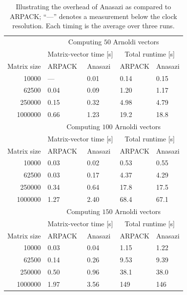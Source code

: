 \documentclass[acmtoms,acmnow]{acmtrans2m}
\begin{document}
\begin{table}
\caption{Illustrating the overhead of Anasazi as compared to ARPACK; ``---'' denotes a measurement
below the clock resolution. Each timing is the average over three runs.}
\label{table:timings}
\begin{center}
\begin{tabular}{r|ll|ll|}
       \cline{2-5} %
        & \multicolumn{4}{c|}{Computing $50$ Arnoldi vectors} \\ \cline{2-5}
        & \multicolumn{2}{c|}{Matrix-vector time [s]} &
       \multicolumn{2}{c|}{Total runtime [s]}\\ \hline
       Matrix size & ARPACK & Anasazi & ARPACK & Anasazi \\ \hline %
       10000 & --- & 0.01 & 0.14 & 0.15 \\
       62500 & 0.04 & 0.09 & 1.20 & 1.17 \\
       250000 & 0.15 & 0.32 & 4.98 & 4.79 \\
       1000000 & 0.66 & 1.23 & 19.2 & 18.8 \\
       \hline
        & \multicolumn{4}{c|}{Computing $100$ Arnoldi vectors} \\ \cline{2-5}
        & \multicolumn{2}{c|}{Matrix-vector time [s]} &
       \multicolumn{2}{c|}{Total runtime [s]}\\ \hline
       Matrix size & ARPACK & Anasazi & ARPACK & Anasazi \\ \hline %
       10000 & 0.03 & 0.02 & 0.53 & 0.55 \\
       62500 & 0.03 & 0.17 & 4.37 & 4.29 \\
       250000 & 0.34 & 0.64 & 17.8 & 17.5 \\
       1000000 & 1.27 & 2.40 & 68.4 & 67.1 \\
       \hline
        & \multicolumn{4}{c|}{Computing $150$ Arnoldi vectors} \\ \cline{2-5}
        & \multicolumn{2}{c|}{Matrix-vector time [s]} &
       \multicolumn{2}{c|}{Total runtime [s]}\\ \hline
       Matrix size & ARPACK & Anasazi & ARPACK & Anasazi \\ \hline %
       10000 & 0.03 & 0.04 & 1.15 & 1.22 \\
       62500 & 0.14 & 0.26 & 9.53 & 9.39 \\
       250000 & 0.50 & 0.96 & 38.1 & 38.0 \\
       1000000 & 1.97 & 3.56 & 149 & 146 \\
       \hline
     \end{tabular}
\end{center}
\end{table}
\end{document}
